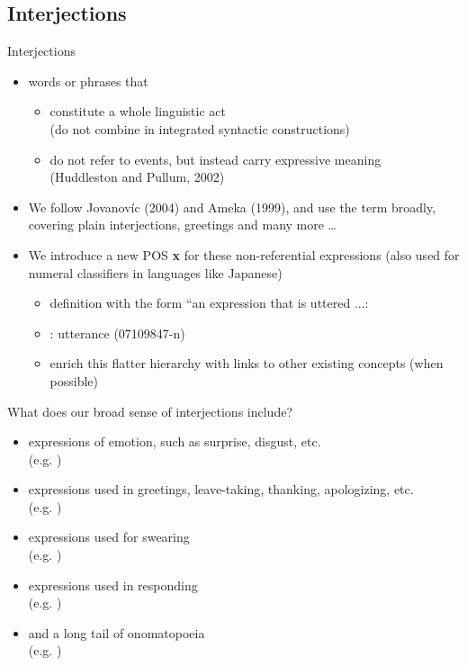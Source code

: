 \documentclass{beamer}
\begin{document}
\subsection{Interjections}
\begin{frame}{Interjections}
  \begin{itemize}
  \item words or phrases that
    \begin{itemize}
    \item constitute a whole linguistic act
      \\ (do not combine in integrated syntactic constructions)
    \item do not refer to events, but instead carry expressive meaning
      \\ (Huddleston and Pullum, 2002)
    \end{itemize}
  \item     We follow Jovanovíc (2004) and Ameka (1999), and use the term broadly,
    covering plain interjections, greetings and many more \ldots
  \item We introduce a new POS \textbf{x} for these non-referential expressions
    (also used for numeral classifiers in languages like Japanese)
    \begin{itemize}
    \item definition with the form ``an expression that is uttered ...:
    \item {}: utterance (07109847-n)
    \item enrich this flatter hierarchy with links to other existing
      concepts (when possible)
    \end{itemize}
  \end{itemize}
\end{frame}

\begin{frame}{What does our broad sense of interjections include?}
  \begin{itemize}
  \item expressions of emotion, such as surprise, disgust, etc.
\\(e.g. )
\item expressions used in greetings, leave-taking, thanking, apologizing, etc.
\\(e.g. )
\item expressions used for swearing
\\ (e.g. )
\item expressions used in responding
\\(e.g. )
\item and a long tail of onomatopoeia
  \\(e.g. )
\end{itemize}
\end{frame}
\end{document}
